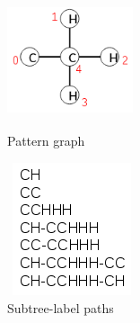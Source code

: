 \documentclass{l4proj}
\begin{document}
\begin{figure}[h]
  \begin{minipage}[t]{.5\textwidth}
    \centering
    \includegraphics[height=3.3cm,width=3.7cm]{images/graphs/C2H3.png}
    \caption{Pattern graph}
    \label{C2H3}
  \end{minipage}
  \begin{minipage}[t]{.5\textwidth}
  \centering
  \includegraphics[height=3.9cm,width=3.8cm]{images/paths/C2H3-isomer-paths.png}
  \caption{Subtree-label paths}
  \label{C2H3-subtree-label-paths}
  \end{minipage}
\end{figure}
\end{document}
